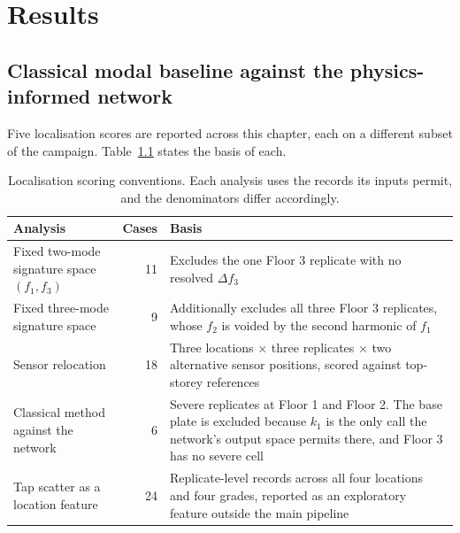 \documentclass[12pt]{report}
\begin{document}
\chapter{Results}
\section{Classical modal baseline against the physics-informed network}
Five localisation scores are reported across this chapter, each on a different subset of the
campaign. Table~\ref{tab:conventions} states the basis of each.

\begin{table}[htbp]
\centering
\small
\caption[Localisation scoring conventions]{Localisation scoring conventions. Each analysis
uses the records its inputs permit, and the denominators differ accordingly.}
\label{tab:conventions}
\begin{tabularx}{\textwidth}{@{}
    >{\RaggedRight\arraybackslash\hsize=0.80\hsize}X
    r
    >{\RaggedRight\arraybackslash\hsize=1.20\hsize}X @{}}
\toprule
Analysis & Cases & Basis \\
\midrule
Fixed two-mode signature space $(f_1,f_3)$
  & 11 & Excludes the one Floor 3 replicate with no resolved $\Delta f_3$ \\
Fixed three-mode signature space
  & 9 & Additionally excludes all three Floor 3 replicates, whose $f_2$ is voided by the
      second harmonic of $f_1$ \\
Sensor relocation
  & 18 & Three locations $\times$ three replicates $\times$ two alternative sensor positions,
      scored against top-storey references \\
Classical method against the network
  & 6 & Severe replicates at Floor 1 and Floor 2. The base plate is excluded because $k_1$ is
      the only call the network's output space permits there, and Floor 3 has no severe cell \\
Tap scatter as a location feature
  & 24 & Replicate-level records across all four locations and four grades, reported as an
      exploratory feature outside the main pipeline \\
\bottomrule
\end{tabularx}
\end{table}
\end{document}
